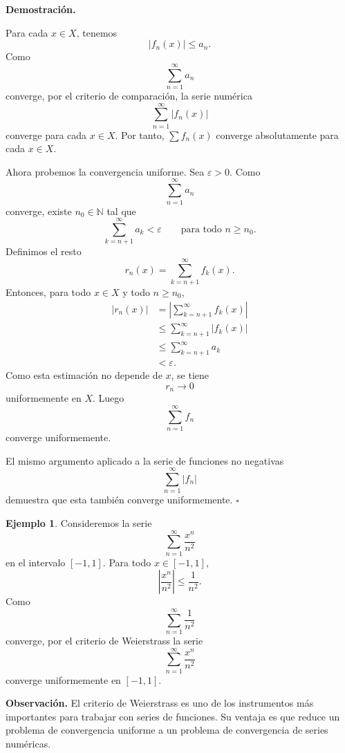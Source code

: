 \documentclass[11pt,a4paper,openany]{book}
\theoremstyle{definition}
\newtheorem{ejemplo}{Ejemplo}[chapter]
\theoremstyle{plain}
\theoremstyle{remark}
\renewenvironment{proof}[1][\textbf{Demostración.}]{%
  \par\noindent #1\ \normalfont
}{\hfill$\square$\par\medskip}
\newenvironment{observacion}
{\par\medskip\noindent\textbf{Observación. }\normalfont}
{\par\medskip}
\newcommand{\N}{\mathbb{N}}
\begin{document}
\begin{proof}
Para cada $x\in X$, tenemos
\[
    |f_n(x)|\leq a_n.
\]
Como
\[
    \sum_{n=1}^{\infty}a_n
\]
converge, por el criterio de comparación, la serie numérica
\[
    \sum_{n=1}^{\infty}|f_n(x)|
\]
converge para cada $x\in X$. Por tanto, $\sum f_n(x)$ converge absolutamente
para cada $x\in X$.

Ahora probemos la convergencia uniforme. Sea $\varepsilon>0$. Como
\[
    \sum_{n=1}^{\infty}a_n
\]
converge, existe $n_0\in\N$ tal que
\[
    \sum_{k=n+1}^{\infty}a_k<\varepsilon
    \qquad\text{para todo }n\geq n_0.
\]
Definimos el resto
\[
    r_n(x)=\sum_{k=n+1}^{\infty} f_k(x).
\]
Entonces, para todo $x\in X$ y todo $n\geq n_0$,
\[
\begin{aligned}
    |r_n(x)|
    &=
    \left|
    \sum_{k=n+1}^{\infty} f_k(x)
    \right| \\
    &\leq
    \sum_{k=n+1}^{\infty}|f_k(x)| \\
    &\leq
    \sum_{k=n+1}^{\infty}a_k \\
    &<\varepsilon.
\end{aligned}
\]
Como esta estimación no depende de $x$, se tiene
\[
    r_n\to 0
\]
uniformemente en $X$. Luego
\[
    \sum_{n=1}^{\infty} f_n
\]
converge uniformemente.

El mismo argumento aplicado a la serie de funciones no negativas
\[
    \sum_{n=1}^{\infty}|f_n|
\]
demuestra que esta también converge uniformemente.
\end{proof}

\begin{ejemplo}
Consideremos la serie
\[
    \sum_{n=1}^{\infty}\frac{x^n}{n^2}
\]
en el intervalo $[-1,1]$. Para todo $x\in[-1,1]$,
\[
    \left|\frac{x^n}{n^2}\right|
    \leq
    \frac{1}{n^2}.
\]
Como
\[
    \sum_{n=1}^{\infty}\frac{1}{n^2}
\]
converge, por el criterio de Weierstrass la serie
\[
    \sum_{n=1}^{\infty}\frac{x^n}{n^2}
\]
converge uniformemente en $[-1,1]$.
\end{ejemplo}

\begin{observacion}
El criterio de Weierstrass es uno de los instrumentos más importantes para
trabajar con series de funciones. Su ventaja es que reduce un problema de
convergencia uniforme a un problema de convergencia de series numéricas.
\end{observacion}
\end{document}
